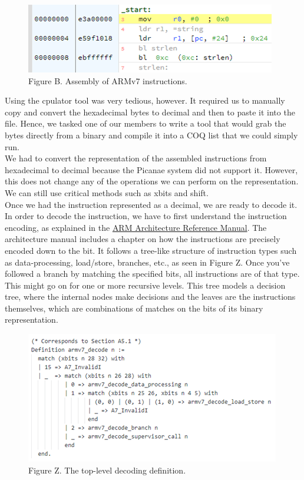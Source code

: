 \documentclass{article}
\begin{document}
\begin{figure}[h]
\includegraphics{cpulator_example.png}\\
Figure B. Assembly of ARMv7 instructions.
\centering
\end{figure}

Using the cpulator tool was very tedious, however. It required us to manually copy and convert the hexadecimal bytes to decimal and then to paste it into the file. Hence, we tasked one of our members to write a tool that would grab the bytes directly from a binary and compile it into a COQ list that we could simply run.\\

We had to convert the representation of the assembled instructions from hexadecimal to decimal because the Picanae system did not support it. However, this does not change any of the operations we can perform on the representation. We can still use critical methods such as xbits and shift.\\

Once we had the instruction represented as a decimal, we are ready to decode it. In order to decode the instruction, we have to first understand the instruction encoding, as explained in the \href{https://developer.arm.com/documentation/ddi0406/c}{ARM Architecture Reference Manual}. The architecture manual includes a chapter on how the instructions are precisely encoded down to the bit. It follows a tree-like structure of instruction types such as data-processing, load/store, branches, etc., as seen in Figure Z.  Once you’ve followed a branch by matching the specified bits, all instructions are of that type. This might go on for one or more recursive levels. This tree models a decision tree, where the internal nodes make decisions and the leaves are the instructions themselves, which are combinations of matches on the bits of its binary representation.\\

\begin{figure}[h]
\includegraphics{top-level_decode.png}\\
Figure Z. The top-level decoding definition.
\centering
\end{figure}
\end{document}
